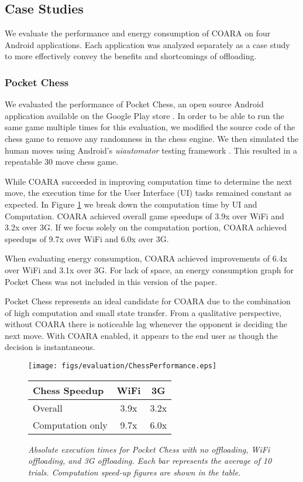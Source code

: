 \documentclass[10pt,journal,cspaper,compsoc]{IEEEtran}
\begin{document}
{\subsection{Case Studies}


We evaluate the performance and energy consumption of COARA on four Android applications.  Each application was analyzed separately as a case study to more effectively convey the benefits and shortcomings of offloading.

\subsubsection{Pocket Chess}
We evaluated the performance of Pocket Chess, an open source Android application available on the Google Play store \cite{pocketChess:Online}.  In order to be able to run the same game multiple times for this evaluation, we modified the source code of the chess game to remove any randomness in the chess engine.  We then simulated the human moves using Android's \emph{uiautomator} testing framework \cite{uiautomator:Online}.  This resulted in a repeatable 30 move chess game.

While COARA succeeded in improving computation time to determine the next move, the execution time for the User Interface (UI) tasks remained constant as expected.  In Figure \ref{fig:chessPerf} we break down the computation time by UI and Computation. COARA achieved overall game speedups of 3.9x over WiFi and 3.2x over 3G.  If we focus solely on the computation portion, COARA achieved speedups of 9.7x over WiFi and 6.0x over 3G.

When evaluating energy consumption, COARA achieved improvements of 6.4x over WiFi and 3.1x over 3G. For lack of space, an energy consumption graph for Pocket Chess was not included in this version of the paper.


Pocket Chess represents an ideal candidate for COARA due to the combination of high computation and small state transfer.  From a qualitative perspective, without COARA there is noticeable lag whenever the opponent is deciding the next move.  With COARA enabled, it appears to the end user as though the decision is instantaneous.

\begin{figure}
\centering
\texttt{[image: figs/evaluation/ChessPerformance.eps]}
\begin{tabular}{|l|c|c|} \hline
\textbf{Chess Speedup}&\textbf{WiFi}&\textbf{3G}\\ \hline
Overall     &3.9x &3.2x\\ \hline
Computation only  &9.7x &6.0x\\
\hline\end{tabular}
\vspace{2 mm}
\caption{\small\textsl{Absolute execution times for Pocket Chess with no offloading, WiFi offloading, and 3G offloading.  Each bar represents the average of 10 trials. Computation speed-up figures are shown in the table.}}
\label{fig:chessPerf}
\end{figure}


}
\end{document}

